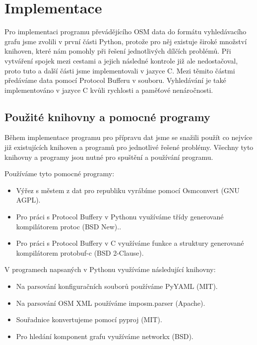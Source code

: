\chapter{Implementace}
Pro implementaci programu převádějícího OSM data do formátu vyhledávacího grafu
jsme zvolili v první části Python, protože pro něj existuje široké množství
knihoven, které nám pomohly při řešení jednotlivých dílčích problémů. Při
vytváření spojek mezi cestami a jejich následné kontrole již ale nedostačoval,
proto tuto a další části jsme implementovali v jazyce C. Mezi těmito částmi
předáváme data pomocí Protocol Bufferu v souboru. Vyhledávání je také
implementováno v jazyce C kvůli rychlosti a paměťové nenáročnosti.

\section{Použité knihovny a pomocné programy}
Během implementace programu pro přípravu dat jsme se snažili použít co nejvíce
již existujících knihoven a programů pro jednotlivé řešené problémy. Všechny
tyto knihovny a programy jsou nutné pro spuštění a používání programu. 

\medskip
\noindent Používáme tyto pomocné programy:
\begin{itemize}
	\item Výřez s městem z dat pro republiku vyrábíme pomocí 
	{\tuc Osmconvert} (GNU AGPL).
	\item Pro práci s Protocol Buffery v Pythonu využíváme třídy generované
	kompilátorem {\tuc protoc} (BSD	New)..
	\item Pro práci s Protocol Buffery v C využíváme funkce a struktury
	generované kompilátorem {\tuc protobuf-c} 
	(BSD 2-Clause).
\end{itemize}

\noindent V programech napsaných v Pythonu využíváme následující knihovny:
\begin{itemize}
	\item Na parsování konfiguračních souborů používáme 
	{\tuc PyYAML} (MIT).
	\item Na parsování OSM XML používáme {\tuc imposm.parser} 
	(Apache).
	\item Souřadnice konvertujeme pomocí {\tuc pyproj}
	(MIT).
	\item Pro hledání komponent grafu využíváme {\tuc networkx} 
	(BSD).
\end{itemize}

